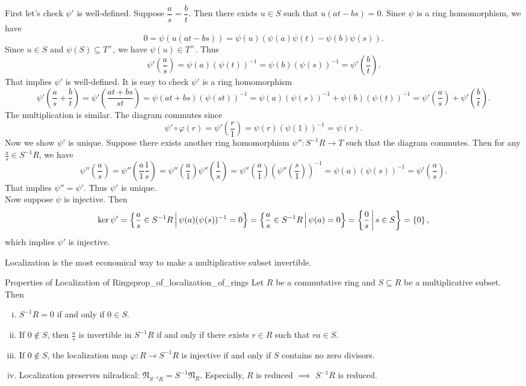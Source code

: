 \begin{prf}
    First let's check $\psi'$ is well-defined. Suppose $\dfrac{a}{s}=\dfrac{b}{t}$. Then there exists $u\in S$ such that $u(at-bs)=0$. Since $\psi$ is a ring homomorphism, we have 
    $$
    0=\psi(u(at-bs))=\psi(u)\left(\psi(a)\psi(t)-\psi(b)\psi(s)\right).
    $$
    Since $u\in S$ and $\psi(S)\subseteq T^\times$, we have $\psi(u)\in T^\times$. Thus
    $$
    \psi'\left(\frac{a}{s}\right)=\psi(a)(\psi(t))^{-1}=\psi(b)(\psi(s))^{-1}= \psi'\left(\frac{b}{t}\right).
    $$ 
    That implies $\psi'$ is well-defined. It is easy to check $\psi'$ is a ring homomorphism
    \[
        \psi'\left(\frac{a}{s}+\frac{b}{t}\right)=\psi'\left(\frac{at+bs}{st}\right)=\psi(at+bs)(\psi(st))^{-1}=\psi(a)(\psi(s))^{-1}+\psi(b)(\psi(t))^{-1}=\psi'\left(\frac{a}{s}\right)+\psi'\left(\frac{b}{t}\right).  
    \]
    The multiplication is similar. The diagram commutes since
    \[
        \psi'\circ\varphi(r)=\psi'\left(\frac{r}{1}\right)=\psi(r)(\psi(1))^{-1}=\psi(r).
    \]
    Now we show $\psi'$ is unique. Suppose there exists another ring homomorphism $\psi'':S^{-1}R\to T$ such that the diagram commutes. Then for any $\frac{a}{s}\in S^{-1}R$, we have 
    \[
        \psi''\left(\frac{a}{s}\right) = \psi''\left(\frac{a}{1}\frac{1}{s}\right) = \psi''\left(\frac{a}{1}\right)\psi''\left(\frac{1}{s}\right) = \psi''\left(\frac{a}{1}\right)\left(\psi''\left(\frac{s}{1}\right)\right)^{-1} = \psi\left(a\right)(\psi(s))^{-1} =    \psi'\left(\frac{a}{s}\right).
    \]
    That implies $\psi''=\psi'$. Thus $\psi'$ is unique.\\
    Now suppose $\psi$ is injective. Then 
    \[
    \ker \psi' = \left\{ \frac{a}{s} \in S^{-1}R \,\middle\vert\, \psi(a)(\psi(s))^{-1} = 0 \right\} = \left\{ \frac{a}{s} \in S^{-1}R \,\middle\vert\, \psi(a) = 0 \right\} = \left\{ \frac{0}{s} \,\middle\vert\, s \in S \right\} = \left\{ 0 \right\},    
    \]
    which implies $\psi'$ is injective.
\end{prf}


Localization is the most economical way to make a multiplicative subset invertible.


\begin{proposition}{Properties of Localization of Rings}{prop_of_localization_of_rings}
    Let $R$ be a commutative ring and $S\subseteq R$ be a multiplicative subset. Then
    \begin{enumerate}[(i)]
        \item $S^{-1}R=0$ if and only if $0\in S$.
        \item If $0\notin S$, then $\frac{a}{s}$ is invertible in $S^{-1}R$ if and only if there exists $r\in R$ such that $ra\in S$.
        \item If $0\notin S$, the localization map $\varphi:R\to S^{-1}R$ is injective if and only if $S$ contains no zero divisors.
        \item Localization preserves nilradical: $\mathfrak{N}_{S^{-1}R}=S^{-1}\mathfrak{N}_R$. Especially, $R$ is reduced $\implies$ $S^{-1}R$ is reduced.
    \end{enumerate}
\end{proposition}

